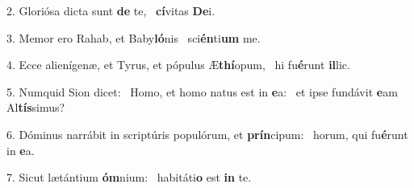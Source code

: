 2. Gloriósa dicta sunt \textbf{de} te, \ast\  \textbf{cí}vitas \textbf{De}i.\

3. Memor ero Rahab, et Baby\textbf{ló}nis \ast\  sci\textbf{én}ti\textbf{um} me.\

4. Ecce alienígenæ, et Tyrus, et pópulus Æ\textbf{thí}opum, \ast\  hi fu\textbf{é}runt \textbf{il}lic.\

5. Numquid Sion dicet: \dag\  Homo, et homo natus est in \textbf{e}a: \ast\  et ipse fundávit \textbf{e}am Al\textbf{tís}simus?\

6. Dóminus narrábit in scriptúris populórum, et \textbf{prín}cipum: \ast\  horum, qui fu\textbf{é}runt in \textbf{e}a.\

7. Sicut lætántium \textbf{óm}nium: \ast\  habitáti\textbf{o} est \textbf{in} te.\

